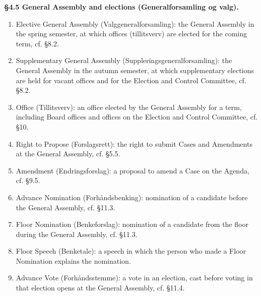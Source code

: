 \documentclass{../../../Common/Latex/Templates/rapport}
\begin{document}
\textbf{\S 4.5 General Assembly and elections (Generalforsamling og valg).}
\begin{enumerate}
  \item Elective General Assembly (Valggeneralforsamling): the General Assembly in the spring semester, at which offices (tillitsverv) are elected for the coming term, cf. \S8.2.
  \item Supplementary General Assembly (Suppleringsgeneralforsamling): the General Assembly in the autumn semester, at which supplementary elections are held for vacant offices and for the Election and Control Committee, cf. \S8.2.
  \item Office (Tillitsverv): an office elected by the General Assembly for a term, including Board offices and offices on the Election and Control Committee, cf. \S10.
  \item Right to Propose (Forslagsrett): the right to submit Cases and Amendments at the General Assembly, cf. \S5.5.
  \item Amendment (Endringsforslag): a proposal to amend a Case on the Agenda, cf. \S9.5.
  \item Advance Nomination (Forhåndsbenking): nomination of a candidate before the General Assembly, cf. \S11.3.
  \item Floor Nomination (Benkeforslag): nomination of a candidate from the floor during the General Assembly, cf. \S11.3.
  \item Floor Speech (Benketale): a speech in which the person who made a Floor Nomination explains the nomination.
  \item Advance Vote (Forhåndsstemme): a vote in an election, cast before voting in that election opens at the General Assembly, cf. \S11.4.
\end{enumerate}
\end{document}
